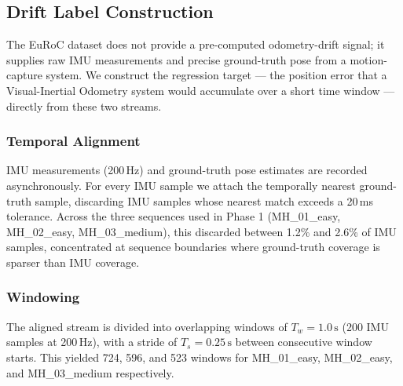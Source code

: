 %

\subsection{Drift Label Construction}
\label{sec:label-construction}

The EuRoC dataset does not provide a pre-computed odometry-drift signal;
it supplies raw IMU measurements and precise ground-truth pose from a
motion-capture system. We construct the regression target — the position
error that a Visual-Inertial Odometry system would accumulate over a
short time window — directly from these two streams.

\subsubsection{Temporal Alignment}
IMU measurements (200\,Hz) and ground-truth pose estimates are recorded
asynchronously. For every IMU sample we attach the temporally nearest
ground-truth sample, discarding IMU samples whose nearest match exceeds
a 20\,ms tolerance. Across the three sequences used in Phase 1
(MH\_01\_easy, MH\_02\_easy, MH\_03\_medium), this discarded between
1.2\% and 2.6\% of IMU samples, concentrated at sequence boundaries
where ground-truth coverage is sparser than IMU coverage.

\subsubsection{Windowing}
The aligned stream is divided into overlapping windows of
$T_w = 1.0\,\mathrm{s}$ (200 IMU samples at 200\,Hz), with a stride of
$T_s = 0.25\,\mathrm{s}$ between consecutive window starts. This yielded
724, 596, and 523 windows for MH\_01\_easy, MH\_02\_easy, and
MH\_03\_medium respectively.

